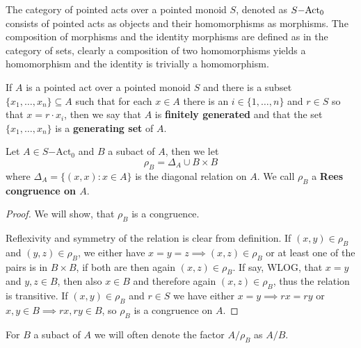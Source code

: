 \begin{remark}
    The category of pointed acts over a pointed monoid $S$, denoted as $S\mathrm{-Act}_0$ consists of pointed acts as objects and their homomorphisms as morphisms.
    The composition of morphisms and the identity morphisms are defined as in the category of sets, clearly a composition of two homomorphisms yields a homomorphism
    and the identity is trivially a homomorphism.
\end{remark}
\begin{definition}
    If $A$ is a pointed act over a pointed monoid $S$ and there is a subset $\{x_1,\dots,x_n\}\subseteq A$ such that 
    for each $x\in A$ there is an $i\in\{1,\dots,n\}$ and $r\in S$ so that $x = r\cdot x_i$, then we say that $A$ is \textbf{finitely generated} 
    and that the set $\{x_1,\dots,x_n\}$ is a \textbf{generating set} of $A$.
\end{definition}
\begin{definition}
    Let $A\in S\mathrm{-Act}_0$ and $B$ a subact of $A$, then we let 
    \[
        \rho_B = \Delta_A \cup B\times B
    \]
    where $\Delta_A= \{(x,x): x\in A \}$ is the diagonal relation on $A$. We call $\rho_B$ a \textbf{Rees congruence on $A$}. 
\end{definition}
\begin{proof}
    We will show, that $\rho_B$ is a congruence. \par 
    Reflexivity and symmetry of the relation is clear from definition. If $(x,y)\in\rho_B$ and $(y,z)\in\rho_B$, we either have 
    $x=y=z \implies (x,z)\in\rho_B$ or at least one of the pairs is in $B\times B$, if both are then again $(x,z)\in\rho_B$. If 
    say, WLOG, that $x=y$ and $y,z\in B$, then also $x\in B$ and therefore again $(x,z)\in\rho_B$, thus the relation is transitive. 
    If $(x,y)\in\rho_B$ and $r\in S$ we have either $x=y\implies rx=ry$ or $x,y\in B \implies rx,ry\in B$, so $\rho_B$ is a congruence on $A$.
\end{proof}
\begin{remark}
    For $B$ a subact of $A$ we will often denote the factor $A/\rho_B$ as $A/B$. 
\end{remark}

